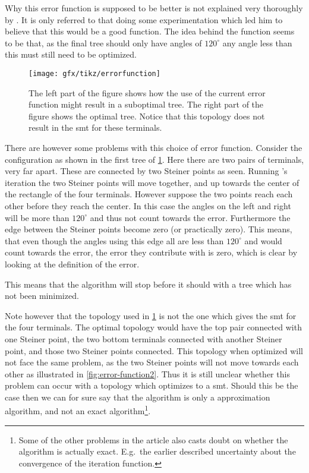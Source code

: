 Why this error function is supposed to be better is not explained very
thoroughly by \citeauthor{smith1992}. It is only referred to that doing some
experimentation which led him to believe that this would be a good function. The
idea behind the function seems to be that, as the final tree should only have
angles of $120^{\circ}$ any angle less than this must still need to be
optimized.

\begin{figure}[htbp]
  \centering
  \texttt{[image: gfx/tikz/errorfunction]}
  \caption[Possible problem with the error function]{The left part of the figure
    shows how the use of the current error function might result in a suboptimal
    tree. The right part of the figure shows the optimal tree. Notice that
    this topology does not result in the \ac{smt} for these
    terminals.\label{fig:error-function}}
\end{figure}

There are however some problems with this choice of error function. Consider
the configuration as shown in the first tree of \cref{fig:error-function}. Here
there are two pairs of terminals, very far apart. These are connected by two
Steiner points as seen. Running \citeauthor{smith1992}'s iteration the two Steiner points will
move together, and up towards the center of the rectangle of the four
terminals. However suppose the two points reach each other before they reach
the center. In this case the angles on the left and right will be more than
$120^{\circ}$ and thus not count towards the error. Furthermore the edge
between the Steiner points become zero (or practically zero). This means, that
even though the angles using this edge all are less than $120^{\circ}$ and would
count towards the error, the error they contribute with is zero, which is clear
by looking at the definition of the error.

This means that the algorithm will stop before it should with a tree which has
not been minimized.

Note however that the topology used in \cref{fig:error-function} is not the one
which gives the \ac{smt} for the four terminals. The optimal topology would have
the top pair connected with one Steiner point, the two bottom terminals
connected with another Steiner point, and those two Steiner points
connected. This topology when optimized will not face the same problem, as the
two Steiner points will not move towards each other as illustrated in
\cref{fig:error-function2}. Thus it is still unclear whether this problem can
occur with a topology which optimizes to a \ac{smt}.  Should this be the case
then we can for sure say that the algorithm is only a approximation algorithm,
and not an exact algorithm\footnote{Some of the other problems in the article
  also casts doubt on whether the algorithm is actually exact. E.g.\ the earlier
described uncertainty about the convergence of the iteration function.}.

